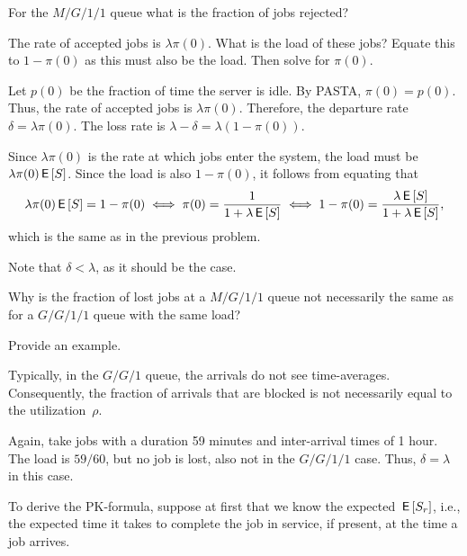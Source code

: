 \documentclass[companion]{subfiles}
\begin{document}
\begin{extra}
 For the $M/G/1/1$ queue what is the fraction of jobs rejected?
\begin{hint}
 The rate of accepted jobs is $\lambda \pi(0)$.
 What is the load of these jobs?
 Equate this to $1-\pi(0)$ as this must also be the load.
 Then solve for $\pi(0)$.
\end{hint}
\begin{solution}
 Let $p(0)$ be the fraction of time the server is idle. By PASTA,
 $\pi(0)=p(0)$. Thus, the rate of accepted jobs is
 $\lambda\pi(0)$. Therefore, the departure rate
 $\delta=\lambda\pi(0)$. The loss rate is
 $\lambda-\delta = \lambda (1-\pi(0))$.

 Since $\lambda\pi(0)$ is the rate at which jobs enter the system,
 the load must be $\lambda\pi(0)\,\mathsf{E}\left[S\right]$. Since the load is also
 $1-\pi(0)$, it follows from equating that
 \begin{equation*}
 \lambda\pi(0) \,\mathsf{E}\left[S\right] = 1 - \pi(0) \iff \pi(0)=\frac1{1+\lambda\,\mathsf{E}\left[S\right]} 
\iff 1-\pi(0) = \frac{\lambda \,\mathsf{E}\left[S\right]}{1+\lambda \,\mathsf{E}\left[S\right]},
 \end{equation*}
which is the same as in the previous problem.

Note that $\delta < \lambda$, as it should be the case. 
\end{solution}
\end{extra}


\begin{extra}
 Why is the fraction of lost jobs at a $M/G/1/1$ queue not necessarily the same as for a $G/G/1/1$ queue with the same load?
\begin{hint}
Provide an example.
\end{hint}
\begin{solution}
 Typically, in the $G/G/1$ queue, the arrivals do not see time-averages. Consequently, the fraction of arrivals that are blocked is not necessarily equal to the utilization~$\rho$.

 Again, take jobs with a duration 59 minutes and inter-arrival times of
 1 hour. The load is $59/60$, but no job is lost, also not in the
 $G/G/1/1$ case. Thus, $\delta=\lambda$ in this case.
\end{solution}
\end{extra}



To derive the PK-formula, suppose at first that we know the expected  $\,\mathsf{E}\left[S_r\right]$, i.e., the expected time it takes to complete the job in service, if present, at the time a job arrives.
\end{document}
